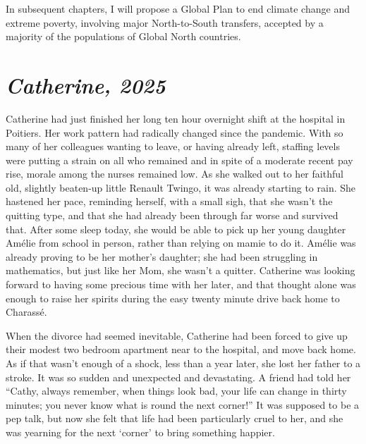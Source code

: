 \documentclass[a5paper,english,openany]{memoir}
\begin{document}
In %
subsequent %
chapters, I will %
propose a Global Plan to end climate change and extreme poverty, involving major North-to-South %
transfers, accepted by a majority of 
the populations of Global North countries.

\chapter*{\textit{Catherine, 2025}}\label{ch:narr_poitiers} 
Catherine had just finished her long ten hour overnight shift at the hospital in Poitiers. Her work pattern had radically changed since the pandemic. With so many of her colleagues wanting to leave, or having already left, staffing levels were putting a strain on all who remained and in spite of a moderate recent pay rise, morale among the nurses remained low. As she walked out to her faithful old, slightly beaten-up little Renault Twingo, it was already starting to rain. She hastened her pace, reminding herself, with a small sigh, that she wasn't the quitting type, and that she had  %
already been through far worse and survived that. After some sleep today, she would be able to pick up her young daughter Amélie from school in person, rather than relying on mamie to do it. Amélie was already proving to be her mother's daughter; she had %
been struggling in mathematics, but just like her Mom, %
she wasn't a quitter. Catherine was looking forward to having some precious time with her later, and that thought alone was enough to raise her spirits during the easy twenty minute drive back home to Charassé.

When the divorce had seemed inevitable, Catherine had been forced to give up their modest two bedroom apartment near to the hospital, and move back home. As if that wasn't enough of a shock, less than a year later, she lost her father to a stroke. It was so sudden and unexpected and devastating. A friend had told her ``Cathy, always remember, when things look bad, your life can change in thirty minutes; you never know what is round the next corner!'' It was supposed to be a pep talk, but now she felt that life had been particularly cruel to her, and she was yearning for the next `corner' to bring something happier.
\end{document}
